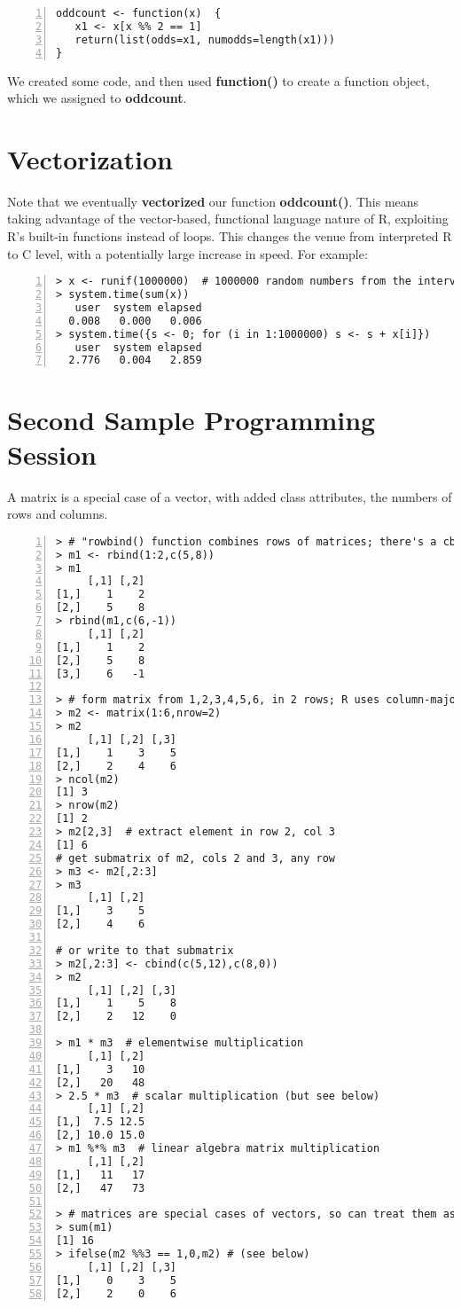 \begin{lstlisting}[numbers=left]
oddcount <- function(x)  {
   x1 <- x[x %% 2 == 1]
   return(list(odds=x1, numodds=length(x1)))
}
\end{lstlisting}
  
We created some code, and then used {\bf function()} to create a function
object, which we assigned to {\bf oddcount}.

\section{Vectorization}

Note that we eventually {\bf vectorized} our function {\bf oddcount()}.
This means taking advantage of the vector-based, functional language
nature of R, exploiting R's built-in functions instead of loops.  This
changes the venue from interpreted R to C level, with a potentially
large increase in speed.  For example:

\begin{lstlisting}[numbers=left]
> x <- runif(1000000)  # 1000000 random numbers from the interval (0,1)
> system.time(sum(x))
   user  system elapsed 
  0.008   0.000   0.006 
> system.time({s <- 0; for (i in 1:1000000) s <- s + x[i]})
   user  system elapsed 
  2.776   0.004   2.859 
\end{lstlisting}

\section{Second Sample Programming Session}

A matrix is a special case of a vector, with added class attributes,
the numbers of rows and columns.

\begin{lstlisting}[numbers=left]
> # "rowbind() function combines rows of matrices; there's a cbind() too
> m1 <- rbind(1:2,c(5,8))
> m1
     [,1] [,2]
[1,]    1    2
[2,]    5    8
> rbind(m1,c(6,-1))
     [,1] [,2]
[1,]    1    2
[2,]    5    8
[3,]    6   -1

> # form matrix from 1,2,3,4,5,6, in 2 rows; R uses column-major storage
> m2 <- matrix(1:6,nrow=2)  
> m2
     [,1] [,2] [,3]
[1,]    1    3    5
[2,]    2    4    6
> ncol(m2)
[1] 3
> nrow(m2)
[1] 2
> m2[2,3]  # extract element in row 2, col 3
[1] 6
# get submatrix of m2, cols 2 and 3, any row
> m3 <- m2[,2:3]
> m3
     [,1] [,2]
[1,]    3    5
[2,]    4    6

# or write to that submatrix
> m2[,2:3] <- cbind(c(5,12),c(8,0))
> m2
     [,1] [,2] [,3]
[1,]    1    5    8
[2,]    2   12    0

> m1 * m3  # elementwise multiplication
     [,1] [,2]
[1,]    3   10
[2,]   20   48
> 2.5 * m3  # scalar multiplication (but see below)
     [,1] [,2]
[1,]  7.5 12.5
[2,] 10.0 15.0
> m1 %*% m3  # linear algebra matrix multiplication
     [,1] [,2]
[1,]   11   17
[2,]   47   73

> # matrices are special cases of vectors, so can treat them as vectors 
> sum(m1)
[1] 16
> ifelse(m2 %%3 == 1,0,m2) # (see below)
     [,1] [,2] [,3]
[1,]    0    3    5
[2,]    2    0    6
\end{lstlisting}


